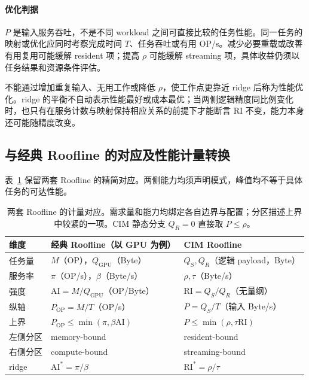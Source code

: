 \documentclass[11pt, a4paper]{ctexart}
\theoremstyle{definition}
\newcommand{\AI}{\mathrm{AI}}
\newcommand{\RI}{\mathrm{RI}}
\begin{document}
\paragraph{优化判据}
$P$ 是输入服务吞吐，不是不同 workload 之间可直接比较的任务性能。同一任务的映射或优化应同时考察完成时间 $T$、任务吞吐或有用 OP/s。减少必要重载或改善有用复用可能缓解 resident 项；提高 $\rho$ 可能缓解 streaming 项，具体收益仍须以任务结果和资源条件评估。

不能通过增加重复输入、无用工作或降低 $\rho$，使工作点更靠近 ridge 后称为性能优化。ridge 的平衡不自动表示性能最好或成本最优；当两侧逻辑精度同比例变化时，也只有在服务计数与映射保持相应关系的前提下才能断言 $\RI$ 不变，能力本身还可能随精度改变。

\subsection{与经典 Roofline 的对应及性能计量转换}
\label{sec:transform}
\label{sec:comparison}

表~\ref{tab:comparison} 保留两套 Roofline 的精简对应。两侧能力均须声明模式，峰值均不等于具体任务的可达性能。

\begin{table}[htbp]
\centering
\small
\renewcommand{\arraystretch}{1.25}
\begin{tabularx}{\textwidth}{@{}p{}XX@{}}
\toprule
\textbf{维度} & \textbf{经典 Roofline（以 GPU 为例）} & \textbf{CIM Roofline} \\
\midrule
任务量 & $M$（OP），$Q_{\mathrm{GPU}}$（Byte） & $Q_S,Q_R$（逻辑 payload，Byte） \\
服务率 & $\pi$（OP/s），$\beta$（Byte/s） & $\rho,\tau$（Byte/s） \\
强度 & $\AI=M/Q_{\mathrm{GPU}}$（OP/Byte） & $\RI=Q_S/Q_R$（无量纲） \\
纵轴 & $P_{\mathrm{OP}}=M/T$（OP/s） & $P=Q_S/T$（输入 Byte/s） \\
上界 & $P_{\mathrm{OP}}\le\min(\pi,\beta\AI)$ & $P\le\min(\rho,\tau\RI)$ \\
左侧分区 & memory-bound & resident-bound \\
右侧分区 & compute-bound & streaming-bound \\
ridge & $\AI^*=\pi/\beta$ & $\RI^*=\rho/\tau$ \\
\bottomrule
\end{tabularx}
\caption{两套 Roofline 的计量对应。需求量和能力均绑定各自边界与配置；分区描述上界中较紧的一项。CIM 静态分支 $Q_R=0$ 直接取 $P\le\rho$。}
\label{tab:comparison}
\end{table}
\end{document}
